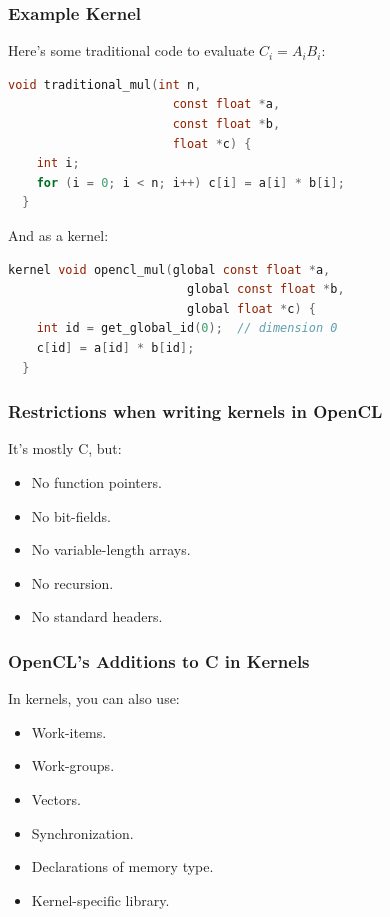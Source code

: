 \begin{frame}[fragile]
  \frametitle{Example Kernel}


    Here's some traditional code to evaluate $C_i = A_iB_i$:

\begin{lstlisting}[language=C]
  void traditional_mul(int n, 
                       const float *a, 
                       const float *b, 
                       float *c) {
    int i;
    for (i = 0; i < n; i++) c[i] = a[i] * b[i];
  }
\end{lstlisting}


And as a kernel:
\begin{lstlisting}[language=C]
  kernel void opencl_mul(global const float *a, 
                         global const float *b,
                         global float *c) {
    int id = get_global_id(0);  // dimension 0
    c[id] = a[id] * b[id];
  }
\end{lstlisting}


\end{frame}

\begin{frame}
  \frametitle{Restrictions when writing kernels in OpenCL}


  It's mostly C, but:
  \begin{itemize}
    \item No function pointers.
    \item No bit-fields.
    \item No variable-length arrays.
    \item No recursion.
    \item No standard headers.
  \end{itemize}

\end{frame}

\begin{frame}
  \frametitle{OpenCL's Additions to C in Kernels}


In kernels, you can also use:
  \begin{itemize}
    \item Work-items.
    \item Work-groups.
    \item Vectors.
    \item Synchronization.
    \item Declarations of memory type.
    \item Kernel-specific library.
  \end{itemize}

\end{frame}


